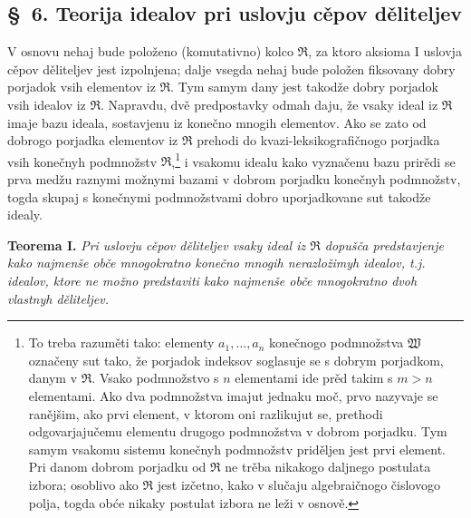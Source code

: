\documentclass[11pt]{article}
\providecommand{\mR}{\mathfrak{R}}
\begin{document}
\setcounter{footnote}{25}

\subsection*{\S~6. Teorija idealov pri uslovju cěpov děliteljev}

V osnovu nehaj bude položeno (komutativno) kolco $\mR$, za ktoro aksioma I uslovja cěpov děliteljev jest izpolnjena; dalje vsegda nehaj bude položen fiksovany dobry porjadok vsih elementov iz $\mR$. Tym samym dany jest takodže dobry porjadok vsih idealov iz $\mR$. Napravdu, dvě predpostavky odmah daju, že vsaky ideal iz $\mR$ imaje bazu ideala, sostavjenu iz konečno mnogih elementov. Ako se zato od dobrogo porjadka elementov iz $\mR$ prehodi do kvazi-leksikografičnogo porjadka vsih konečnyh podmnožstv $\mR$,\footnote{To treba razuměti tako: elementy $a_1,\ldots,a_n$ konečnogo podmnožstva $\mathfrak W$ označeny sut tako, že porjadok indeksov soglasuje se s dobrym porjadkom, danym v $\mR$. Vsako podmnožstvo s $n$ elementami ide prěd takim s $m>n$ elementami. Ako dva podmnožstva imajut jednaku moč, prvo nazyvaje se ranějšim, ako prvi element, v ktorom oni razlikujut se, prethodi odgovarjajučemu elementu drugogo podmnožstva v dobrom porjadku. Tym samym vsakomu sistemu konečnyh podmnožstv priděljen jest prvi element. Pri danom dobrom porjadku od $\mR$ ne trěba nikakogo daljnego postulata izbora; osoblivo ako $\mR$ jest izčetno, kako v slučaju algebraičnogo čislovogo polja, togda obće nikaky postulat izbora ne leži v osnově.} i vsakomu idealu kako vyznačenu bazu prirědi se prva medžu raznymi možnymi bazami v dobrom porjadku konečnyh podmnožstv, togda skupaj s konečnymi podmnožstvami dobro uporjadkovane sut takodže idealy.

\textbf{Teorema I.} \emph{Pri uslovju cěpov děliteljev vsaky ideal iz $\mR$ dopušča predstavjenje kako najmenše obče mnogokratno konečno mnogih nerazložimyh idealov, t.j. idealov, ktore ne možno predstaviti kako najmenše obče mnogokratno dvoh vlastnyh děliteljev.}
\end{document}
